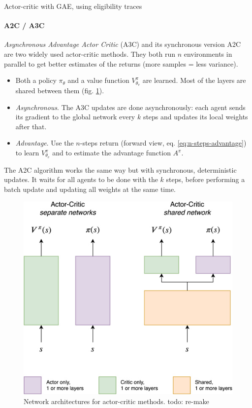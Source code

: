 \begin{algorithm}[H]
\DontPrintSemicolon
{}
\caption{Actor-critic with GAE, using eligibility traces}
\label{algo:gae-eligibility-traces}
\end{algorithm}


\paragraph{A2C / A3C}
\emph{Asynchronous Advantage Actor Critic} (A3C) \cite{mnih2016asynchronous} and its synchronous version A2C are two widely used actor-critic methods. They both run $n$ environments in parallel to get better estimates of the returns (more samples = less variance).
\begin{itemize}
    \item Both a policy $\pi_\theta$ and a value function $V^{\pi}_{\theta_v}$ are learned. Most of the layers are shared between them (fig. \ref{fig:actor-critic-architecture}).
    \item \emph{Asynchronous}. The A3C updates are done asynchronously: each agent sends its gradient to the global network every $k$ steps and updates its local weights after that.
    \item \emph{Advantage}. Use the $n$-steps return (forward view, eq. \ref{eq:n-steps-advantage}) to learn $V^\pi_{\theta_v}$ and to estimate the advantage function $A^\pi$.
\end{itemize}
The A2C algorithm works the same way but with synchronous, deterministic updates. It waits for all agents to be done with the $k$ steps, before performing a batch update and updating all weights at the same time.


\begin{figure}[H]
    \centering
    \includegraphics[width=0.5\linewidth]{figures/actor-critic-architecture.jpg}
    \caption{Network architectures for actor-critic methods. todo: re-make}
    \label{fig:actor-critic-architecture}
\end{figure}

